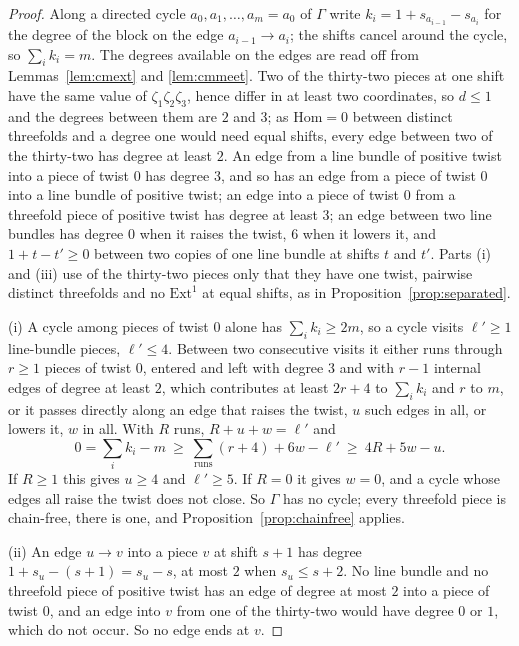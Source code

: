 \documentclass[11pt,reqno]{amsart}
\numberwithin{equation}{section}
\theoremstyle{plain}
\theoremstyle{definition}
\newcommand{\Ext}{\mathrm{Ext}}
\newcommand{\Hom}{\mathrm{Hom}}
\begin{document}
\begin{proof}
Along a directed cycle $a_{0},a_{1},\dots,a_{m}=a_{0}$ of $\Gamma$ write $k_{i}=1+s_{a_{i-1}}-s_{a_{i}}$ for the degree of the block on the edge $a_{i-1}\to a_{i}$; the shifts cancel around the cycle, so $\sum_{i}k_{i}=m$. The degrees available on the edges are read off from Lemmas~\ref{lem:cmext} and \ref{lem:cmmeet}. Two of the thirty-two pieces at one shift have the same value of $\zeta_{1}\zeta_{2}\zeta_{3}$, hence differ in at least two coordinates, so $d\le1$ and the degrees between them are $2$ and $3$; as $\Hom=0$ between distinct threefolds and a degree one would need equal shifts, every edge between two of the thirty-two has degree at least $2$. An edge from a line bundle of positive twist into a piece of twist $0$ has degree $3$, and so has an edge from a piece of twist $0$ into a line bundle of positive twist; an edge into a piece of twist $0$ from a threefold piece of positive twist has degree at least $3$; an edge between two line bundles has degree $0$ when it raises the twist, $6$ when it lowers it, and $1+t-t'\ge0$ between two copies of one line bundle at shifts $t$ and $t'$. Parts (i) and (iii) use of the thirty-two pieces only that they have one twist, pairwise distinct threefolds and no $\Ext^{1}$ at equal shifts, as in Proposition~\ref{prop:separated}.

(i) A cycle among pieces of twist $0$ alone has $\sum_{i}k_{i}\ge2m$, so a cycle visits $\ell'\ge1$ line-bundle pieces, $\ell'\le4$. Between two consecutive visits it either runs through $r\ge1$ pieces of twist $0$, entered and left with degree $3$ and with $r-1$ internal edges of degree at least $2$, which contributes at least $2r+4$ to $\sum_{i}k_{i}$ and $r$ to $m$, or it passes directly along an edge that raises the twist, $u$ such edges in all, or lowers it, $w$ in all. With $R$ runs, $R+u+w=\ell'$ and
\[
0=\sum_{i}k_{i}-m\ \ge\ \sum_{\mathrm{runs}}(r+4)+6w-\ell'\ \ge\ 4R+5w-u .
\]
If $R\ge1$ this gives $u\ge4$ and $\ell'\ge5$. If $R=0$ it gives $w=0$, and a cycle whose edges all raise the twist does not close. So $\Gamma$ has no cycle; every threefold piece is chain-free, there is one, and Proposition~\ref{prop:chainfree} applies.

(ii) An edge $u\to v$ into a piece $v$ at shift $s+1$ has degree $1+s_{u}-(s+1)=s_{u}-s$, at most $2$ when $s_{u}\le s+2$. No line bundle and no threefold piece of positive twist has an edge of degree at most $2$ into a piece of twist $0$, and an edge into $v$ from one of the thirty-two would have degree $0$ or $1$, which do not occur. So no edge ends at $v$.


\end{proof}
\end{document}
